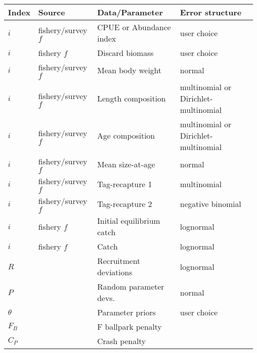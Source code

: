 \begin{longtable}{p{1cm} p{3.5cm} p{5.5cm} p{5cm}}
	\hline
	Index & Source & Data/Parameter & Error structure\Tstrut\Bstrut\\
	\hline	
	$i$ & fishery/survey $f$ & CPUE or Abundance index   & user choice \Tstrut\\
	$i$ & fishery $f$        & Discard biomass           & user choice \Tstrut\\
	$i$ & fishery/survey $f$ & Mean body weight          & normal \Tstrut\\
	$i$ & fishery/survey $f$ & Length composition        & multinomial or Dirichlet-multinomial\Tstrut\\
	$i$ & fishery/survey $f$ & Age composition           & multinomial or Dirichlet-multinomial\Tstrut\\
	$i$ & fishery/survey $f$ & Mean size-at-age          & normal \Tstrut\\
	$i$ & fishery/survey $f$ & Tag-recapture 1           & multinomial \Tstrut\\
	$i$ & fishery/survey $f$ & Tag-recapture 2           & negative binomial\Tstrut\\
	$i$ & fishery $f$        & Initial equilibrium catch & lognormal \Tstrut\\
	$i$ & fishery $f$        & Catch                     & lognormal \Tstrut\\
	$R$ & 					 & Recruitment deviations    & lognormal \Tstrut\\
	$P$ & 					 & Random parameter devs.    & normal \Tstrut\\
	$\theta$ & 				 & Parameter priors	         & user choice\Tstrut\\
	$F_B$ & 				 & F ballpark penalty	     &  \Tstrut\\
	$C_P$ &				     & Crash penalty             &  \Tstrut\Bstrut\\
	\hline
\end{longtable}




\pagebreak